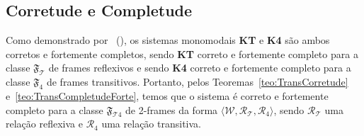         \subsection{Corretude e Completude}
            \label{subsec:KT4CorretudeCompletude}
            Como demonstrado por~ (\citeyear{blackburn2001modal}), os sistemas monomodais \textbf{KT} e \textbf{K4} são ambos corretos e fortemente completos, sendo \textbf{KT} correto e fortemente completo
            para a classe \(\mathfrak{F}_{\mathcal{T}}\) de frames reflexivos e sendo \textbf{K4} correto e fortemente completo para a classe \(\mathfrak{F}_{4}\) de frames transitivos.
            Portanto, pelos Teoremas~\ref{teo:TransCorretude} e~\ref{teo:TransCompletudeForte}, temos que o sistema \SisT é correto e fortemente completo para a classe
            \(\mathfrak{F}_{\mathcal{T}4}\) de 2-frames da forma \(\langle \mathcal{W}, \mathcal{R}_{\mathcal{T}}, \mathcal{R}_{4} \rangle\), sendo \(\mathcal{R}_{\mathcal{T}}\) uma relação
            reflexiva e \(\mathcal{R}_{4}\) uma relação transitiva.